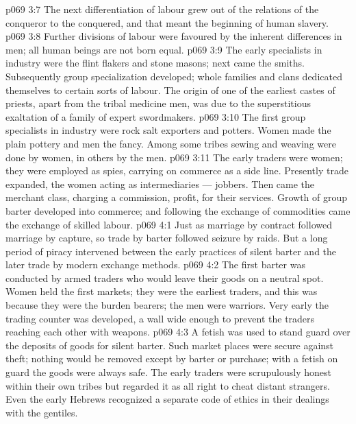 \vs p069 3:7 \bibnobreakspace {} The next differentiation of labour grew out of the relations of the conqueror to the conquered, and that meant the beginning of human slavery.
\vs p069 3:8 \bibnobreakspace {} Further divisions of labour were favoured by the inherent differences in men; all human beings are not born equal.
\vs p069 3:9 The early specialists in industry were the flint flakers and stone masons; next came the smiths. Subsequently group specialization developed; whole families and clans dedicated themselves to certain sorts of labour. The origin of one of the earliest castes of priests, apart from the tribal medicine men, was due to the superstitious exaltation of a family of expert swordmakers.
\vs p069 3:10 \pc The first group specialists in industry were rock salt exporters and potters. Women made the plain pottery and men the fancy. Among some tribes sewing and weaving were done by women, in others by the men.
\vs p069 3:11 The early traders were women; they were employed as spies, carrying on commerce as a side line. Presently trade expanded, the women acting as intermediaries --- jobbers. Then came the merchant class, charging a commission, profit, for their services. Growth of group barter developed into commerce; and following the exchange of commodities came the exchange of skilled labour.
\vs p069 4:1 Just as marriage by contract followed marriage by capture, so trade by barter followed seizure by raids. But a long period of piracy intervened between the early practices of silent barter and the later trade by modern exchange methods.
\vs p069 4:2 The first barter was conducted by armed traders who would leave their goods on a neutral spot. Women held the first markets; they were the earliest traders, and this was because they were the burden bearers; the men were warriors. Very early the trading counter was developed, a wall wide enough to prevent the traders reaching each other with weapons.
\vs p069 4:3 A fetish was used to stand guard over the deposits of goods for silent barter. Such market places were secure against theft; nothing would be removed except by barter or purchase; with a fetish on guard the goods were always safe. The early traders were scrupulously honest within their own tribes but regarded it as all right to cheat distant strangers. Even the early Hebrews recognized a separate code of ethics in their dealings with the gentiles.

